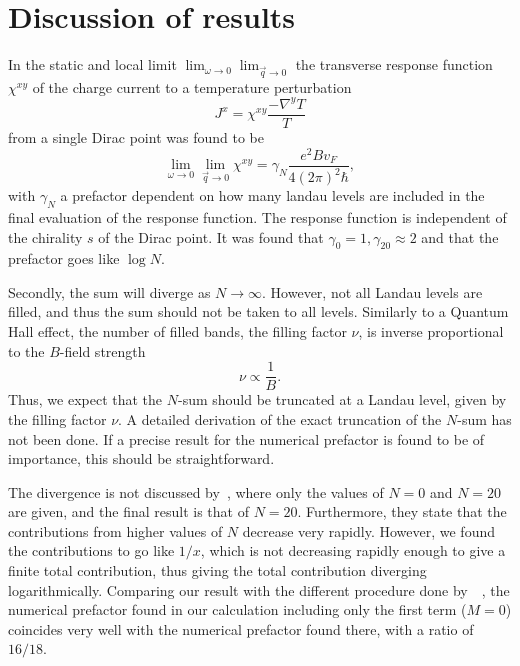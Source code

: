 \documentclass[
draft,
paper=B5,
]{scrbook}
\begin{document}
\section{Discussion of results}
In the static and local limit $\lim_{\omega \to 0} \lim_{\vec{q}\to 0}$ the  transverse response function $\chi^{xy}$ of the charge current to a temperature perturbation
\begin{equation}
  J^x = \chi ^{xy} \frac{- \nabla^y T}{T}
\end{equation}
from a single Dirac point was found  to be
\begin{equation}
  \lim_{\omega \to 0} \lim_{\vec{q}\to 0}
  \chi ^{xy}
  =
  \gamma_{N}
  \frac{e^2 B v_F}{4 (2\pi )^2 \hbar },
\end{equation}
with $\gamma _N$ a prefactor dependent on how many landau levels are included in the final evaluation of the response function.
The response function is independent of the chirality $s$ of the Dirac point.
It was found that $\gamma _0 = 1, \gamma _{20} \approx 2$ and that the prefactor goes like $\log N$.


Secondly, the sum will diverge as $N\to \infty $.
However, not all Landau levels are filled, and thus the sum should not be taken to all levels.
Similarly to a Quantum Hall effect, the number of filled bands, the filling factor $\nu $, is inverse proportional to the $B$-field strength
\begin{equation}
  \nu \propto \frac{1}{B}.
\end{equation}
Thus, we expect that the $N$-sum should be truncated at a Landau level, given by the filling factor $\nu $.
A detailed derivation of the exact truncation of the $N$-sum has not been done.
If a precise result for the numerical prefactor is found to be of importance, this should be straightforward.

The divergence is not discussed by~\citeauthor{arjonaFingerprintsConformalAnomaly2019}, where only the values of $N = 0$ and  $N=20$ are given, and the final result is that of $N=20$.
Furthermore, they state that the contributions from higher values of $N$ decrease very rapidly.
However, we found the contributions to go like $1 /x$, which is not decreasing rapidly enough to give a finite total contribution, thus giving the total contribution diverging logarithmically.
Comparing our result with the different procedure done by~\citeauthor{chernodubGenerationNernstCurrent2018}~\cite{chernodubGenerationNernstCurrent2018}, the numerical prefactor found in our calculation including only the first term ($M=0$) coincides very well with the numerical prefactor found there, with a ratio of $16 / 18$.

\appendix




\backmatter
\printglossaries

\printbibliography

% 
\end{document}
